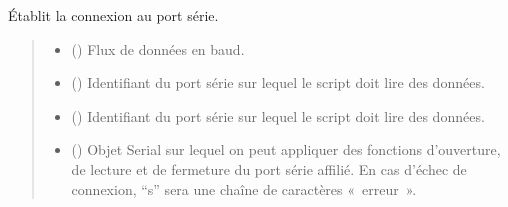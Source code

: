 \documentclass[letterpaper,10pt,french]{sphinxmanual}
\begin{document}

\begin{fulllineitems}
\label{\detokenize{library:lib_pH.port_connexion}}
\pysigstartsignatures
\pysiglinewithargsret
{}
{\sphinxparamcomma {}}
{}
\pysigstopsignatures
\sphinxAtStartPar
Établit la connexion au port série.
\begin{quote}\begin{description}
\begin{itemize}
\item {} 
\sphinxAtStartPar
{} () \textendash{} Flux de données en baud.

\item {} 
\sphinxAtStartPar
{} () \textendash{} Identifiant du port série sur lequel le script doit lire des données.

\end{itemize}

\sphinxAtStartPar
\begin{itemize}
\item {} 
\sphinxAtStartPar
{} () \textendash{} Identifiant du port série sur lequel le script doit lire des données.

\item {} 
\sphinxAtStartPar
{} () \textendash{} Objet Serial sur lequel on peut appliquer des fonctions d’ouverture, de lecture et de fermeture du port série affilié. En cas d’échec de connexion, “s” sera une chaîne de caractères « erreur ».

\end{itemize}


\end{description}\end{quote}

\end{fulllineitems}
\end{document}

